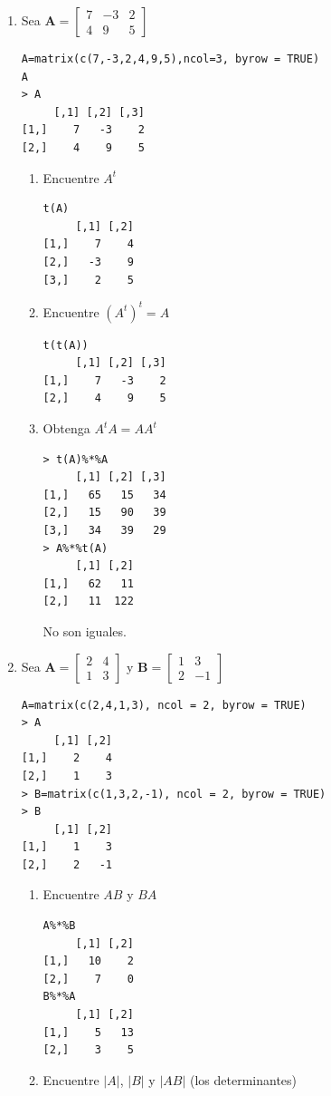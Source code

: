 \documentclass[12pt,a4paper]{report}
\author{Guadalupe Monroy}
\begin{document}

\begin{enumerate}
\item Sea $\textbf{A}=\begin{bmatrix}7 & -3 & 2\\4 & 9 & 5\end{bmatrix}$
\begin{verbatim}
A=matrix(c(7,-3,2,4,9,5),ncol=3, byrow = TRUE)
A
> A
     [,1] [,2] [,3]
[1,]    7   -3    2
[2,]    4    9    5
\end{verbatim}
\begin{enumerate}
\item Encuentre $A^{t}$
\begin{verbatim}
t(A)
     [,1] [,2]
[1,]    7    4
[2,]   -3    9
[3,]    2    5
\end{verbatim}
\item Encuentre $(A^{t})^{t}=A$
\begin{verbatim}
t(t(A))
     [,1] [,2] [,3]
[1,]    7   -3    2
[2,]    4    9    5
\end{verbatim}
\item Obtenga $A^{t}A=AA^{t}$
\begin{verbatim}
> t(A)%*%A
     [,1] [,2] [,3]
[1,]   65   15   34
[2,]   15   90   39
[3,]   34   39   29
> A%*%t(A)
     [,1] [,2]
[1,]   62   11
[2,]   11  122
\end{verbatim}
No son iguales.
\end{enumerate}
\item Sea $\textbf{A}=\begin{bmatrix}2 & 4\\1 & 3\end{bmatrix}$ y $\textbf{B}=\begin{bmatrix}1 & 3\\2 & -1\end{bmatrix}$ 
\begin{verbatim}
A=matrix(c(2,4,1,3), ncol = 2, byrow = TRUE)
> A
     [,1] [,2]
[1,]    2    4
[2,]    1    3
> B=matrix(c(1,3,2,-1), ncol = 2, byrow = TRUE)
> B
     [,1] [,2]
[1,]    1    3
[2,]    2   -1
\end{verbatim}
\begin{enumerate}
\item Encuentre $AB$ y $BA$
\begin{verbatim}
A%*%B
     [,1] [,2]
[1,]   10    2
[2,]    7    0
B%*%A
     [,1] [,2]
[1,]    5   13
[2,]    3    5
\end{verbatim}
\item Encuentre $\vert A\vert$, $\vert B\vert$ y $\vert AB\vert$ (los determinantes)

\end{enumerate}
\end{enumerate}
\end{document}
